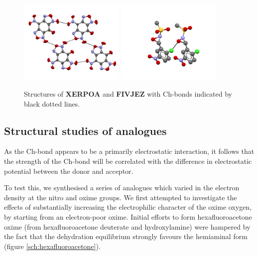 \begin{refsection}
    \begin{figure}
        \centering
        \includegraphics[width=0.45\textwidth]{Figures/XERPOA.pdf}
        \includegraphics[width=0.45\textwidth]{Figures/FIVJEZ.pdf}
        \caption[Structures of \textbf{XERPOA} and \textbf{FIVJEZ}.]{Structures of \textbf{XERPOA} and \textbf{FIVJEZ} with Ch-bonds indicated by black dotted lines.}
        \label{fig:furoxan-oxaziridine}
    \end{figure}
    
    \subsection{Structural studies of analogues}
    As the Ch-bond appears to be a primarily electrostatic interaction, it follows that the strength of the Ch-bond will be correlated with the difference in electrostatic potential between the donor and acceptor.
    
    To test this, we synthesised a series of analogues which varied in the electron density at the nitro and oxime groups.
    We first attempted to investigate the effects of substantially increasing the electrophilic character of the oxime oxygen, by starting from an electron-poor oxime.
    Initial efforts to form hexafluoroacetone oxime (from hexafluoroacetone deuterate and hydroxylamine) were hampered by the fact that the dehydration equilibrium strongly favours the hemiaminal form (figure \cref{sch:hexafluoroacetone}).
    

\end{refsection}

